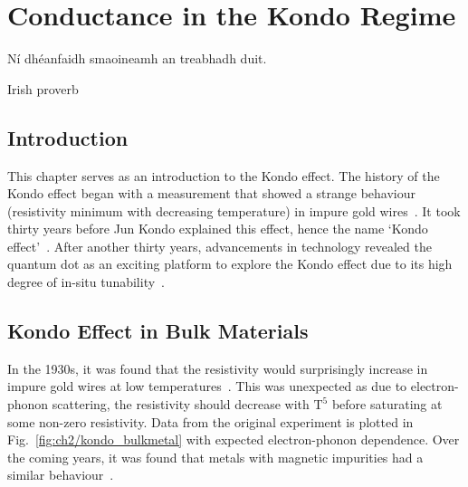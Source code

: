 \chapter{Conductance in the Kondo Regime}\label{cha:kondo_conductance}


\epigraph{Ní dhéanfaidh smaoineamh an treabhadh duit.}{Irish proverb}


\section{Introduction}
\noindent This chapter serves as an introduction to the Kondo effect. The history of the Kondo effect began with a measurement that showed a strange behaviour (resistivity minimum with decreasing temperature) in impure gold wires~\cite{de_haas}. It took thirty years before Jun Kondo explained this effect, hence the name `Kondo effect'~\cite{jun_kondo}. After another thirty years, advancements in technology revealed the quantum dot as an exciting platform to explore the Kondo effect due to its high degree of in-situ tunability~\cite{goldhaber_first_kondo}. 



\section{Kondo Effect in Bulk Materials}


In the 1930s, it was found that the resistivity would surprisingly increase in impure gold wires at low temperatures~\cite{de_haas}. This was unexpected as due to electron-phonon scattering, the resistivity should decrease with $\mathrm{T^5}$ before saturating at some non-zero resistivity. Data from the original experiment is plotted in Fig.~\ref{fig:ch2/kondo_bulkmetal} with expected electron-phonon dependence. Over the coming years, it was found that metals with magnetic impurities had a similar behaviour~\cite{still_irresistible}.


